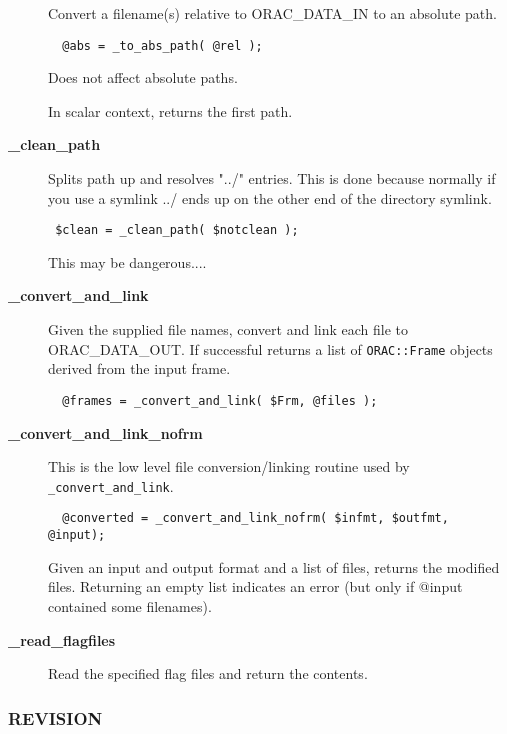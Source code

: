 \begin{description}
Convert a filename(s) relative to ORAC\_DATA\_IN to an absolute path.

\begin{verbatim}
  @abs = _to_abs_path( @rel );
\end{verbatim}


Does not affect absolute paths.



In scalar context, returns the first path.


\item[{\textbf{\_clean\_path}}] \mbox{}

Splits path up and resolves "../" entries. This is done because normally if you
use a symlink ../ ends up on the other end of the directory symlink.

\begin{verbatim}
 $clean = _clean_path( $notclean );
\end{verbatim}


This may be dangerous....


\item[{\textbf{\_convert\_and\_link}}] \mbox{}

Given the supplied file names, convert and link each file to ORAC\_DATA\_OUT.
If successful returns a list of \texttt{ORAC::Frame} objects derived from the input frame.

\begin{verbatim}
  @frames = _convert_and_link( $Frm, @files );
\end{verbatim}

\item[{\textbf{\_convert\_and\_link\_nofrm}}] \mbox{}

This is the low level file conversion/linking routine used by
\texttt{\_convert\_and\_link}.

\begin{verbatim}
  @converted = _convert_and_link_nofrm( $infmt, $outfmt, @input);
\end{verbatim}


Given an input and output format and a list of files, returns
the modified files. Returning an empty list indicates an error (but
only if @input contained some filenames).


\item[{\textbf{\_read\_flagfiles}}] \mbox{}

Read the specified flag files and return the contents.

\end{description}
\subsubsection*{REVISION\label{ORAC::Loop_REVISION}}


